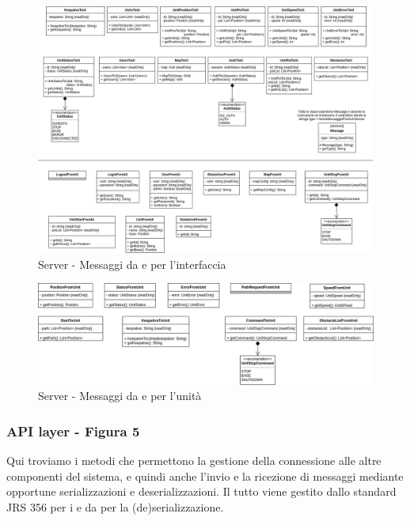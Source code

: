 		\begin{landscape}
			\begin{figure}[]
				\centering
				\includegraphics[width=23cm]{img/server_from_to_ui.png}
				\caption{Server - Messaggi da e per l'interfaccia}
			\end{figure}
		\end{landscape}
		\begin{landscape}

			\begin{figure}[H]
				\centering
				\includegraphics[width=22cm]{img/server_from_to_unit.png}
				\caption{Server - Messaggi da e per l'unità}
			\end{figure}
		\end{landscape}

	\subsubsection{API layer - Figura 5}
		Qui troviamo i metodi che permettono la gestione della connessione alle altre componenti del sistema, e quindi anche l'invio e la ricezione di messaggi mediante opportune serializzazioni e deserializzazioni. Il tutto viene gestito dallo standard JRS 356 per i  e da  per la (de)serializzazione.

